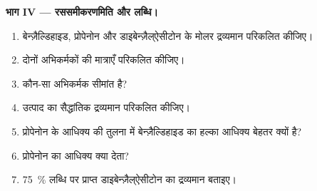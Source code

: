 \begin{problem}
\medskip
\noindent\textbf{भाग IV --- रससमीकरणमिति और लब्धि।}
\begin{enumerate}[resume]
  \item बेन्ज़ैल्डिहाइड, प्रोपेनोन और डाइबेन्ज़ैल्ऐसीटोन के मोलर द्रव्यमान परिकलित कीजिए।
  \item दोनों अभिकर्मकों की मात्राएँ परिकलित कीजिए।
  \item कौन-सा अभिकर्मक सीमांत है?
  \item उत्पाद का सैद्धांतिक द्रव्यमान परिकलित कीजिए।
  \item प्रोपेनोन के आधिक्य की तुलना में बेन्ज़ैल्डिहाइड का हल्का आधिक्य बेहतर क्यों है?
  \item प्रोपेनोन का आधिक्य क्या देता?
  \item 75~\% लब्धि पर प्राप्त डाइबेन्ज़ैल्ऐसीटोन का द्रव्यमान बताइए।
\end{enumerate}
\end{problem}
